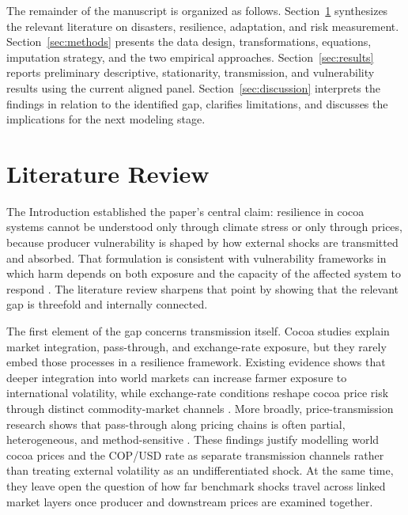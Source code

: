 \documentclass[11pt]{article}
\begin{document}
The remainder of the manuscript is organized as follows. Section~\ref{sec:litreview} synthesizes the relevant literature on disasters, resilience, adaptation, and risk measurement. Section~\ref{sec:methods} presents the data design, transformations, equations, imputation strategy, and the two empirical approaches. Section~\ref{sec:results} reports preliminary descriptive, stationarity, transmission, and vulnerability results using the current aligned panel. Section~\ref{sec:discussion} interprets the findings in relation to the identified gap, clarifies limitations, and discusses the implications for the next modeling stage.

\section{Literature Review}
\label{sec:litreview}

The Introduction established the paper's central claim: resilience in cocoa systems cannot be understood only through climate stress or only through prices, because producer vulnerability is shaped by how external shocks are transmitted and absorbed. That formulation is consistent with vulnerability frameworks in which harm depends on both exposure and the capacity of the affected system to respond \citep{Adger2006,parker2019}. The literature review sharpens that point by showing that the relevant gap is threefold and internally connected.

The first element of the gap concerns transmission itself. Cocoa studies explain market integration, pass-through, and exchange-rate exposure, but they rarely embed those processes in a resilience framework. Existing evidence shows that deeper integration into world markets can increase farmer exposure to international volatility, while exchange-rate conditions reshape cocoa price risk through distinct commodity-market channels \citep{TsowouGayi2019,Poku2017}. More broadly, price-transmission research shows that pass-through along pricing chains is often partial, heterogeneous, and method-sensitive \citep{MeyerCramon2004,acosta_ihle_voncramon_2019}. These findings justify modelling world cocoa prices and the COP/USD rate as separate transmission channels rather than treating external volatility as an undifferentiated shock. At the same time, they leave open the question of how far benchmark shocks travel across linked market layers once producer and downstream prices are examined together.
\end{document}
